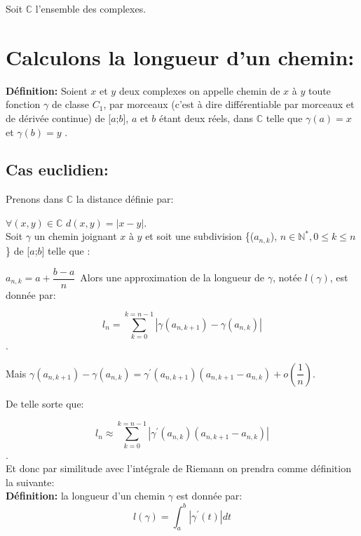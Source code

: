 \documentclass[a4paper, 12pt, twoside]{book}
\begin{document}
   Soit $\mathbb{C}$ l'ensemble des complexes.\\
   
  \section{ Calculons la longueur d'un chemin:}
  
 
  
 
  
  
   
   
   
   \textbf{Définition:} Soient $x$ et $y$ deux complexes on appelle chemin de $x$ à $y$ toute fonction  $\gamma$ de classe $C_{1}$, par morceaux (c'est à dire différentiable par morceaux et de dérivée continue) de [$a$;$b$], $a$ et $b$ étant deux réels, dans $\mathbb{C}$ telle que $\gamma(a)=x$ et $\gamma(b)=y$ .\\
  

  \subsection{Cas euclidien:}
  
 Prenons dans  $\mathbb{C}$ la distance définie par:\
  
   $\forall (x,y) \in\mathbb{C}$ $d(x,y)=|x-y|$.\\
   
   Soit $\gamma$ un chemin joignant $x$ à $y$ et soit une subdivision \{($a_{n,k}$),   $n \in \mathbb{N^{*}}, 0\leq k \leq n$\} de [$a$;$b$] telle que :\
   
   $a_{n,k}=a+\dfrac{b-a}{n}$\
   Alors une approximation de la longueur de $\gamma$, notée $l(\gamma)$, est donnée par:\
   
  $$l_{n}=\sum_{k=0}^{k=n-1}|\gamma(a_{n,k+1})-\gamma(a_{n,k})|$$.
   
   Mais $\gamma(a_{n,k+1})-\gamma(a_{n,k})=\gamma^{'}(a_{n,k+1})(a_{n,k+1}-a_{n,k})+o(\dfrac{1}{n})$.\
   
 De  telle sorte que:\
 
 $$l_{n}\approx \sum_{k=0}^{k=n-1}|\gamma^{'}(a_{n,k})(a_{n,k+1}-a_{n,k})|$$.  \\
 
 Et donc par similitude avec l'intégrale de Riemann on prendra comme définition la suivante:\\
 
 \textbf{Définition:} la longueur d'un chemin $\gamma$ est donnée par:
 $$l(\gamma)=\int_{a}^{b} |\gamma^{'}(t)|dt$$\\
 
\end{document}
